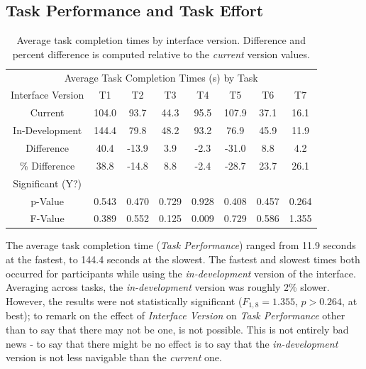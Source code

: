\documentclass{acm_proc_article-sp}
\begin{document}
\subsection{Task Performance and Task Effort}
\begin{table}
    \centering
    \begin{tabular}{| c | c | c | c | c | c | c | c |}
    \hline
    \multicolumn{8}{|c|}{Average Task Completion Times (s) by Task} \\
    Interface Version & T1 & T2 & T3 & T4 & T5 & T6 & T7 \\
    \hline
    \hline
    Current           & 104.0 &  93.7 &  44.3 &  95.5 & 107.9 &  37.1 &   16.1 \\
    \hline
    In-Development    & 144.4 &  79.8 &  48.2 &  93.2 &  76.9 &  45.9 &   11.9 \\
    \hline
    \hline
    Difference        & 40.4  & -13.9 &   3.9 &  -2.3 & -31.0 &   8.8 &    4.2 \\
    \hline
    \% Difference     & 38.8  & -14.8 &   8.8 &  -2.4 & -28.7 &  23.7 &   26.1 \\
    \hline
    \hline
    Significant (Y?) &        &       &       &       &       &       &       \\
    \hline
    p-Value          & 0.543  & 0.470 & 0.729 & 0.928 & 0.408 & 0.457 & 0.264 \\
    \hline
    F-Value          & 0.389  & 0.552 & 0.125 & 0.009 & 0.729 & 0.586 & 1.355 \\
    \hline
    \end{tabular}
    
    \caption{Average task completion times by interface version. Difference and percent difference is computed relative to the \emph{current} version values.}
    \label{tab:avg_task_time}
\end{table}

The average task completion time (\emph{Task Performance}) ranged from 11.9 seconds at the fastest, to 144.4 seconds at the slowest. The fastest and slowest times both occurred for participants while using the \emph{in-development} version of the interface. Averaging across tasks, the \emph{in-development} version was roughly 2\% slower. However, the results were not statistically significant ($F_{1,8} = 1.355$, $p > 0.264$, at best); to remark on the effect of \emph{Interface Version} on \emph{Task Performance} other than to say that there may not be one, is not possible. This is not entirely bad news - to say that there might be no effect is to say that the \emph{in-development} version is not less navigable than the \emph{current} one. 
\end{document}
